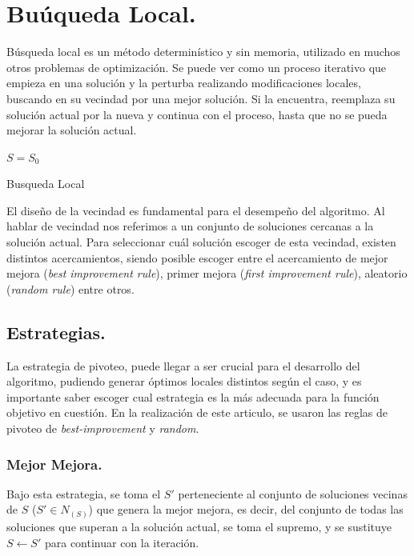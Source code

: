 \documentclass{ci5652}
\begin{document}
\section{Buúqueda Local.}
	Búsqueda local es un método determinístico y sin memoria, utilizado en muchos otros problemas de optimización. Se puede ver como un proceso iterativo que empieza en una solución y la perturba realizando modificaciones locales, buscando en su vecindad por una mejor solución. Si la encuentra, reemplaza su solución actual por la nueva y continua con el proceso, hasta que no se pueda mejorar la solución actual.\\

	\begin{algorithm}
		\DontPrintSemicolon
		\vspace*{0.1cm}
		$S = S_0$\;
		\vspace*{0.1cm}
		\caption{Busqueda Local}
	\end{algorithm}
		
	El diseño de la vecindad es fundamental para el desempeño del algoritmo. Al hablar de vecindad nos referimos a un conjunto de soluciones cercanas a la solución actual. Para seleccionar cuál solución escoger de esta vecindad, existen distintos acercamientos, siendo posible escoger entre el acercamiento de mejor mejora (\textit{best improvement rule}), primer mejora (\textit{first improvement rule}), aleatorio (\textit{random rule}) entre otros.\\

	\subsection{Estrategias.} 
		La estrategia de pivoteo, puede llegar a ser crucial para el desarrollo del algoritmo, pudiendo generar óptimos locales distintos según el caso, y es importante saber escoger cual estrategia es la más adecuada para la función objetivo en cuestión.
		En la realización de este articulo, se usaron las reglas de pivoteo de \textit{best-improvement} y \textit{random}.
		
		\subsubsection{Mejor Mejora.}
			Bajo esta estrategia, se toma el $S'$ perteneciente al conjunto de soluciones vecinas de $S$ ($S' \in N_{(S)}$) que genera la mejor mejora, es decir, del conjunto de todas las soluciones que superan a la solución actual, se toma el supremo, y se sustituye $S \leftarrow S'$ para continuar con la iteración.
		
\end{document}
